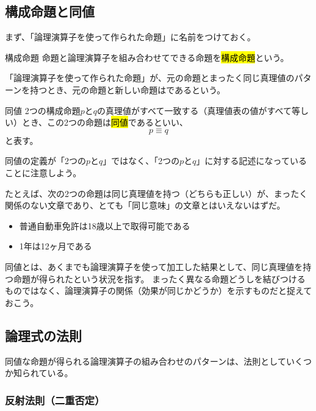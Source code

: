 \documentclass[../../imaging-math]{subfiles}
\begin{document}
\subsection{構成命題と同値}

まず、「論理演算子を使って作られた命題」に名前をつけておく。

\begin{definition}{構成命題}
  命題と論理演算子を組み合わせてできる命題を\hl{構成命題}という。
\end{definition}

「論理演算子を使って作られた命題」が、元の命題とまったく同じ真理値のパターンを持つとき、元の命題と新しい命題はであるという。

\begin{definition}{同値}
  \titlegap
  2つの構成命題$p$と$q$の真理値がすべて一致する（真理値表の値がすべて等しい）とき、この2つの命題は\hl{同値}であるといい、
  \LARGE
  \begin{equation*}
    p \equiv q
  \end{equation*}
  \normalsize
  と表す。
\end{definition}

同値の定義が「2つの$p$と$q$」ではなく、「2つの$p$と$q$」に対する記述になっていることに注意しよう。

\br

たとえば、次の2つの命題は同じ真理値を持つ（どちらも正しい）が、まったく関係のない文章であり、とても「同じ意味」の文章とはいえないはずだ。

\begin{itemize}
  \item 普通自動車免許は18歳以上で取得可能である
  \item 1年は12ヶ月である
\end{itemize}

同値とは、あくまでも論理演算子を使って加工した結果として、同じ真理値を持つ命題が得られたという状況を指す。
まったく異なる命題どうしを結びつけるものではなく、論理演算子の関係（効果が同じかどうか）を示すものだと捉えておこう。

\subsection{論理式の法則}

同値な命題が得られる論理演算子の組み合わせのパターンは、法則としていくつか知られている。

\subsubsection{反射法則（二重否定）}
\end{document}

